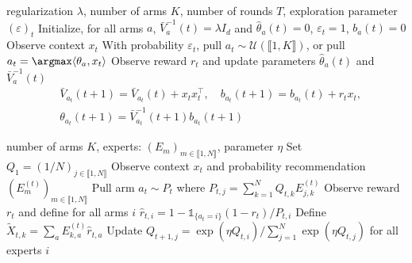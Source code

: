 \begin{algorithm}[h]
  \caption{\epsgreedy}
  \label{alg:egreedy}
\begin{algorithmic}
   regularization  $\lambda$, number of arms $K$, number of rounds $T$, exploration parameter $(\varepsilon)_{t}$
	\STATE Initialize, for all arms $a$, $\bar{V}_{a}^{-1}(t) = \lambda I_{d}$ and $\hat{\theta}_{a}(t) = 0$, $\varepsilon_{t} = 1$, $b_{a}(t) = 0$
  \STATE Observe context $x_{t}$
  \STATE With probability $\varepsilon_{t}$, pull $a_{t} \sim \mathcal{U}\left(\llbracket 1,K\rrbracket\right)$, or pull $a_{t} = \argmax \langle \theta_{a}, x_{t}\rangle$ 
  \STATE Observe reward $r_{t}$ and update parameters $\hat{\theta}_{a}(t)$ and $\bar{V}_{a}^{-1}(t)$
    \begin{align*}
      &\bar{V}_{a_{t}}(t+1) = \bar{V}_{a_{t}}(t) + x_{t}x_{t}^{\intercal},\quad b_{a_{t}}(t+1) = b_{a_{t}}(t) + r_{t}x_{t},\\
      &\theta_{a_{t}}(t+1) = \bar{V}_{a_{t}}^{-1}(t+1)b_{a_{t}}(t+1)
  \end{align*}
  \ENDFOR
\end{algorithmic}
\end{algorithm}

\begin{algorithm}[h]
  \caption{\expfour}
  \label{alg:exp4}
\begin{algorithmic}
	 number of arms $K$, experts: $(E_{m})_{m\in\llbracket 1, N\rrbracket}$, parameter $\eta$
  \STATE Set $Q_{1} = (1/N)_{j\in\llbracket 1, N\rrbracket}$
  \STATE Observe context $x_{t}$ and probability recommendation $(E_{m}^{(t)})_{m\in\llbracket 1, N\rrbracket}$
  \STATE Pull arm $a_{t}\sim P_{t}$ where $P_{t,j} = \sum_{k=1}^{N} Q_{t,k}E_{j,k}^{(t)}$ 
  \STATE Observe reward $r_{t}$ and define for all arms $i$ $\hat{r}_{t,i} = 1 - \mathds{1}_{\{ a_{t}=i\}}( 1 - r_{t})/P_{t,i}$
  \STATE Define $\tilde{X}_{t,k} = \sum_{a} E_{k, a}^{(t)}\hat{r}_{t,a}$
  \STATE Update $Q_{t+1, j} = \exp(\eta Q_{t,i})/\sum_{j=1}^{N} \exp(\eta Q_{t,j})$ for all experts $i$
  \ENDFOR
\end{algorithmic}
\end{algorithm}
